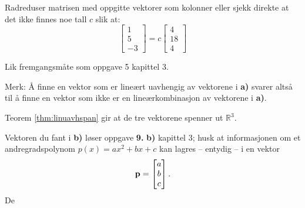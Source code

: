 \begin{losning}

\begin{punkt}
Radreduser matrisen med oppgitte vektorer som kolonner eller sjekk
direkte at det ikke finnes noe tall $c$ slik at:
\[
\begin{bmatrix}
1\\
5\\
-3
\end{bmatrix}=c\begin{bmatrix}
4\\
18\\
4
\end{bmatrix}
\]
\end{punkt}

\begin{punkt}
Lik fremgangsmåte som oppgave 5 kapittel 3.

\noindent
Merk: Å finne en vektor som er lineært uavhengig av vektorene i \textbf{a)} svarer altså til å finne en vektor som ikke er en lineærkombinasjon av vektorene i \textbf{a)}. 
\end{punkt}

\begin{punkt}
Teorem \ref{thm:linuavhspan} gir at de tre vektorene spenner ut $\mathbb{R}^3$.

Vektoren du fant i \textbf{b)} løser oppgave \textbf{9.} \textbf{b)} kapittel 3; husk at informasjonen om et andregradspolynom $p(x)=ax^2+bx+c$ kan lagres -- entydig -- i en vektor $$\mathbf{p}=\begin{bmatrix}
a\\
b\\
c
\end{bmatrix}.$$ De
\end{punkt}

\end{losning}






